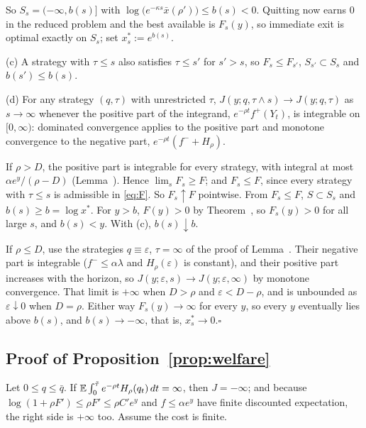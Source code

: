So $S_s=(-\infty,b(s)]$ with $\log\big(e^{-\kappa s}\bar x(\rho')\big)\le b(s)<0$. Quitting now earns $0$ in the reduced problem and the best available is $F_s(y)$, so immediate exit is optimal exactly on $S_s$; set $x^*_s:=e^{b(s)}$.

(c) A strategy with $\tau\le s$ also satisfies $\tau\le s'$ for $s'>s$, so $F_s\le F_{s'}$, $S_{s'}\subset S_s$ and $b(s')\le b(s)$.

(d) For any strategy $(q,\tau)$ with unrestricted $\tau$, $J(y;q,\tau\wedge s)\to J(y;q,\tau)$ as $s\to\infty$ whenever the positive part of the integrand, $e^{-\rho t}f^+(Y_t)$, is integrable on $[0,\infty)$: dominated convergence applies to the positive part and monotone convergence to the negative part, $e^{-\rho t}(f^-+H_\rho)$.

If $\rho>D$, the positive part is integrable for every strategy, with integral at most $\alpha e^y/(\rho-D)$ (Lemma~). Hence $\lim_sF_s\ge F$; and $F_s\le F$, since every strategy with $\tau\le s$ is admissible in \eqref{eq:F}. So $F_s\uparrow F$ pointwise. From $F_s\le F$, $S\subset S_s$ and $b(s)\ge b=\log x^*$. For $y>b$, $F(y)>0$ by Theorem~, so $F_s(y)>0$ for all large $s$, and $b(s)<y$. With (c), $b(s)\downarrow b$.

If $\rho\le D$, use the strategies $q\equiv\varepsilon$, $\tau=\infty$ of the proof of Lemma~. Their negative part is integrable ($f^-\le\alpha\lambda$ and $H_\rho(\varepsilon)$ is constant), and their positive part increases with the horizon, so $J(y;\varepsilon,s)\to J(y;\varepsilon,\infty)$ by monotone convergence. That limit is $+\infty$ when $D>\rho$ and $\varepsilon<D-\rho$, and is unbounded as $\varepsilon\downarrow0$ when $D=\rho$. Either way $F_s(y)\to\infty$ for every $y$, so every $y$ eventually lies above $b(s)$, and $b(s)\to-\infty$, that is, $x^*_s\to0$.\hfill$\square$

\subsection*{Proof of Proposition~\ref{prop:welfare}}

Let $0\le q\le\bar q$. If $\mathbb{E}\int_0^{\tilde\tau}e^{-\rho t}H_\rho(q_t)\,dt=\infty$, then $J=-\infty$; and because $\log(1+\rho F')\le\rho F'\le\rho C'e^{y}$ and $f\le\alpha e^y$ have finite discounted expectation, the right side is $+\infty$ too. Assume the cost is finite.


